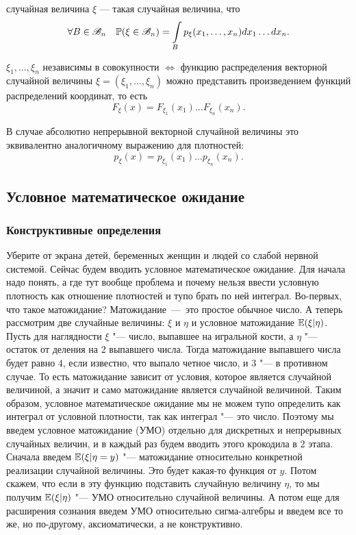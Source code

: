 \documentclass[../TV&MS.tex]{subfiles}
\begin{document}
\begin{Def}
	 случайная величина $\xi$ --- такая случайная величина, что
	$$\forall B \in \mathscr{B}_n \quad \mathbb{P}(\xi \in \mathscr{B}_n) = 
	\int\limits_B p_\xi(x_1, \ldots, x_n)dx_1\ldots dx_n.$$ 
\end{Def}

	$\xi_1, \ldots, \xi_n$ независимы в совокупности $\Leftrightarrow$ функцию распределения 
	векторной случайной величины $\xi = (\xi_1, \ldots, \xi_n)$ можно представить 
	произведением функций распределений координат, то есть 
	$$F_\xi(x) = F_{\xi_1}(x_1)\ldots F_{\xi_n}(x_n).$$

	В случае абсолютно непрерывной векторной случайной величины это эквивалентно 
	аналогичному выражению для плотностей:
	$$p_\xi(x) = p_{\xi_1}(x_1)\ldots p_{\xi_n}(x_n).$$
	

\subsection{Условное математическое ожидание}

\subsubsection{Конструктивные определения}

\begin{Why}
    Уберите от экрана детей, беременных женщин и людей со слабой нервной системой.
	Сейчас будем вводить условное математическое ожидание. Для начала надо понять, 
	а где тут вообще проблема и почему нельзя ввести условную плотность как отношение 
	плотностей и тупо брать по ней интеграл. Во-первых, что такое матожидание?
	Матожидание~---~это простое обычное число. А теперь рассмотрим две случайные 
	величины: $\xi$ и $\eta$ и условное матожидание $\mathbb{E}(\xi|\eta)$.
	Пусть для наглядности $\xi$ "--- число, выпавшее на игральной кости, а $\eta$
	"--- остаток от деления на $2$ выпавшего числа. Тогда матожидание выпавшего числа 
	будет равно $4$, если известно, что выпало четное число, и $3$ "--- в противном случае.
	То есть матожидание зависит от условия, которое является случайной величиной, 
	а значит и само матожидание является случайной величиной.
	Таким образом, условное математическое ожидание мы не можем тупо определить как интеграл 
	от условной плотности, так как интеграл "--- это число. Поэтому мы введем условное 
	матожидание (УМО) отдельно для дискретных и непрерывных случайных величин, и в каждый раз 
	будем вводить этого крокодила в $2$ этапа. Сначала введем $\mathbb{E}(\xi | \eta = y)$ "--- 
	матожидание относительно конкретной реализации случайной величины. Это будет какая-то 
	функция от $y$. Потом скажем, что если в эту функцию подставить случайную величину $\eta$, 
	то мы получим $\mathbb{E}(\xi | \eta)$ "--- УМО относительно случайной величины.
	А потом еще для расширения сознания введем УМО относительно сигма-алгебры и 
	введем все то же, но по-другому, аксиоматически, а не конструктивно.
\end{Why}
\end{document}
